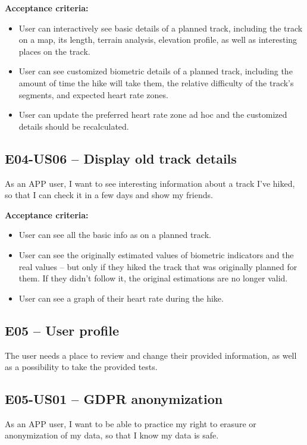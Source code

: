 \textbf{Acceptance criteria:}
\begin{itemize}
    \item User can interactively see basic details of a planned track, including the track on a map, its length, terrain analysis, elevation profile, as well as interesting places on the track.
    \item User can see customized biometric details of a planned track, including the amount of time the hike will take them, the relative difficulty of the track's segments, and expected heart rate zones.
    \item User can update the preferred heart rate zone ad hoc and the customized details should be recalculated.
\end{itemize}

\subsection*{E04-US06 -- Display old track details}
As an APP user, I want to see interesting information about a track I've hiked, so that I can check it in a few days and show my friends.

\textbf{Acceptance criteria:}
\begin{itemize}
    \item User can see all the basic info as on a planned track.
    \item User can see the originally estimated values of biometric indicators and the real values -- but only if they hiked the track that was originally planned for them. If they didn't follow it, the original estimations are no longer valid.
    \item User can see a graph of their heart rate during the hike.
\end{itemize}


\subsection*{E05 -- User profile}
The user needs a place to review and change their provided information, as well as a possibility to take the provided tests.

\subsection*{E05-US01 -- GDPR anonymization}
As an APP user, I want to be able to practice my right to erasure or anonymization of my data, so that I know my data is safe.

